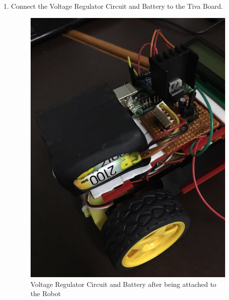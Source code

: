 \documentclass[a4paper,12pt,oneside]{book}
\begin{document}
\begin{enumerate}
	\item Connect the Voltage Regulator Circuit and Battery to the Tiva Board.
	\begin{figure}[h]
		\centering
		\includegraphics[scale=0.16]{battery_a}
		\caption{ Voltage Regulator Circuit and Battery  after being attached to the Robot}
	\end{figure}


\end{enumerate}
\end{document}
